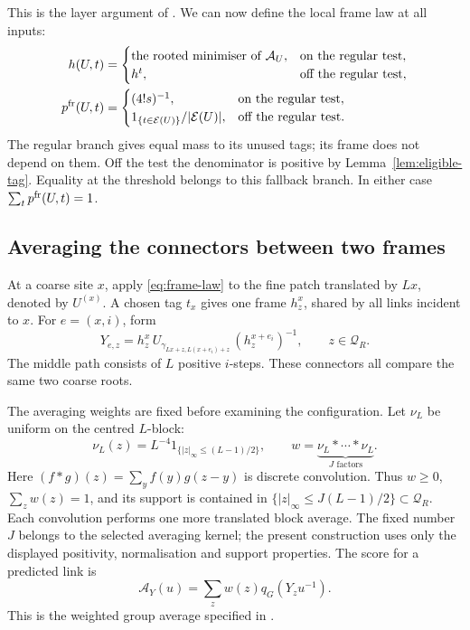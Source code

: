 \documentclass[11pt,reqno]{amsart}
\numberwithin{equation}{section}
\theoremstyle{definition}
\theoremstyle{remark}
\begin{document}
This is the layer argument of
\cite[Lemma~14.2 and (14.8), p.~58]{Main}.
We can now define the local frame law at all inputs:
\begin{equation}
 \begin{split}
 h(U,t)&=
 \begin{cases}
  \text{the rooted minimiser of }\mathcal A_U,&\text{on the regular test},\\
  h^t,&\text{off the regular test},
 \end{cases}\\
 p^{\rm fr}(U,t)&=
 \begin{cases}
  (4!s)^{-1},&\text{on the regular test},\\
  1_{\{t\in\mathcal E(U)\}}/|\mathcal E(U)|,
                                      &\text{off the regular test}.
 \end{cases}
 \end{split}
 \label{eq:frame-law}
\end{equation}
The regular branch gives equal mass to its unused tags; its frame
does not depend on them. Off the test the denominator is positive
by Lemma~\ref{lem:eligible-tag}. Equality at the threshold belongs
to this fallback branch. In either case
\(\sum_t p^{\rm fr}(U,t)=1\).

\subsection{Averaging the connectors between two frames}

At a coarse site \(x\), apply \eqref{eq:frame-law} to the fine
patch translated by \(Lx\), denoted by \(U^{(x)}\). A chosen tag
\(t_x\) gives one frame \(h_z^x\), shared by all links incident
to \(x\). For \(e=(x,i)\), form
\begin{equation}
 Y_{e,z}=h_z^x\,
       U_{\gamma_{Lx+z,L(x+e_i)+z}}\,(h_z^{x+e_i})^{-1},
       \qquad z\in\mathcal Q_R.
 \label{eq:actual-connectors}
\end{equation}
The middle path consists of \(L\) positive \(i\)-steps. These
connectors all compare the same two coarse roots.

The averaging weights are fixed before examining the configuration.
Let \(\nu_L\) be uniform on the centred \(L\)-block:
\begin{equation}
 \nu_L(z)=L^{-4}1_{\{|z|_\infty\le(L-1)/2\}},\qquad
 w=\underbrace{\nu_L*\cdots*\nu_L}_{J\text{ factors}}.
 \label{eq:convolution-weights}
\end{equation}
Here \((f*g)(z)=\sum_yf(y)g(z-y)\) is discrete convolution.
Thus \(w\ge0\), \(\sum_z w(z)=1\), and its support is contained
in \(\{|z|_\infty\le J(L-1)/2\}\subset\mathcal Q_R\).
Each convolution performs one more translated block average.
The fixed number \(J\) belongs to the selected averaging kernel;
the present construction uses only the displayed positivity,
normalisation and support properties.
The score for a predicted link is
\begin{equation}
                 \mathcal A_Y(u)=\sum_z w(z)q_G(Y_zu^{-1}).
 \label{eq:actual-predictor-score}
\end{equation}
This is the weighted group average specified in
\cite[(14.3), p.~56]{Main}.
\end{document}
